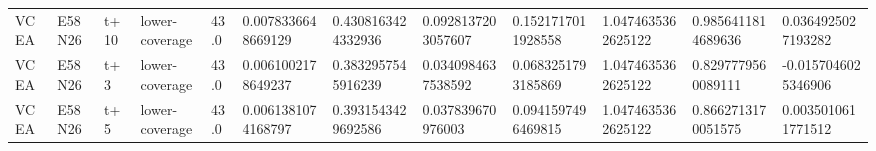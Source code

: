 \begin{landscape}
\begin{longtable}{llllllllllll}
VCEA & E58N26 & t+10 & lower-coverage & 43.0 & 0.0078336648669129 & 0.4308163424332936 & 0.0928137203057607 & 0.1521717011928558 & 1.0474635362625122 & 0.9856411814689636 & 0.0364925027193282 \\
VCEA & E58N26 & t+3 & lower-coverage & 43.0 & 0.0061002178649237 & 0.3832957545916239 & 0.0340984637538592 & 0.0683251793185869 & 1.0474635362625122 & 0.8297779560089111 & -0.0157046025346906 \\
VCEA & E58N26 & t+5 & lower-coverage & 43.0 & 0.0061381074168797 & 0.3931543429692586 & 0.037839670976003 & 0.0941597496469815 & 1.0474635362625122 & 0.8662713170051575 & 0.0035010611771512 \\
\bottomrule
\end{longtable}
\end{landscape}

